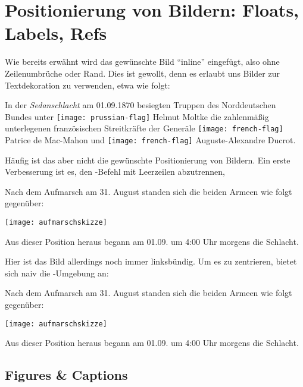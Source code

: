 \section{Positionierung von Bildern: Floats, Labels, Refs}
Wie bereits erwähnt wird das gewünschte Bild \enquote{inline} eingefügt, also ohne Zeilenumbrüche oder Rand.
Dies ist gewollt, denn es erlaubt uns Bilder zur Textdekoration zu verwenden, etwa wie folgt:
\begin{latexlisting}
	In der \emph{Sedanschlacht} am 01.09.1870 besiegten Truppen des Norddeutschen Bundes unter \texttt{[image: prussian-flag]} Helmut Moltke die zahlenmäßig unterlegenen französischen Streitkräfte der Generäle \texttt{[image: french-flag]} Patrice de Mac-Mahon und \texttt{[image: french-flag]} Auguste-Alexandre Ducrot.
\end{latexlisting}
Häufig ist das aber nicht die gewünschte Positionierung von Bildern.
Ein erste Verbesserung ist es, den -Befehl mit Leerzeilen abzutrennen,
\begin{latexlisting}
	Nach dem Aufmarsch am 31. August standen sich die beiden Armeen wie folgt gegenüber:

	\texttt{[image: aufmarschskizze]}

	Aus dieser Position heraus begann am 01.09. um 4:00 Uhr morgens die Schlacht.
\end{latexlisting}
Hier ist das Bild allerdings noch immer linksbündig.
Um es zu zentrieren, bietet sich naiv die -Umgebung an:
\begin{latexlisting}
	Nach dem Aufmarsch am 31. August standen sich die beiden Armeen wie folgt gegenüber:

	\begin{center}
		\texttt{[image: aufmarschskizze]}		
	\end{center}

	Aus dieser Position heraus begann am 01.09. um 4:00 Uhr morgens die Schlacht.
\end{latexlisting}

\subsection{Figures \& Captions}

